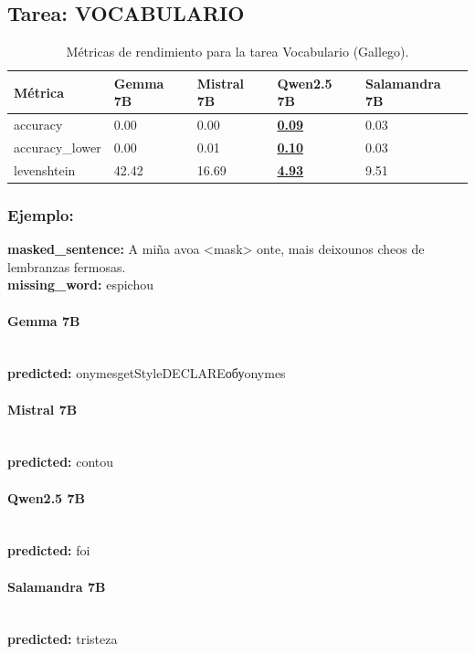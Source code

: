 \subsection{Tarea: VOCABULARIO}\label{tarea-vocabulario}
\begin{longtable}[]{@{}lllll@{}}
\toprule\noalign{}
Métrica & Gemma 7B & Mistral 7B & Qwen2.5 7B & Salamandra 7B \\
\midrule\noalign{}
\endhead
\bottomrule\noalign{}
\caption{Métricas de rendimiento para la tarea Vocabulario (Gallego).}
\label{tab:metricas_vocabulario_Gallego}
\endlastfoot
accuracy & 0.00 & 0.00 & \textbf{\underline{0.09}} & 0.03 \\
accuracy\_lower & 0.00 & 0.01 & \textbf{\underline{0.10}} & 0.03 \\
levenshtein & 42.42 & 16.69 & \textbf{\underline{4.93}} & 9.51 \\
\end{longtable}

\subsubsection{Ejemplo:}
\textbf{masked\_sentence:} A miña avoa {\textless}mask{\textgreater} onte, mais deixounos cheos de lembranzas fermosas.\\
\textbf{missing\_word:} espichou

\paragraph{Gemma 7B}~\\
\textbf{predicted:} onymesgetStyleDECLAREобуonymes

\paragraph{Mistral 7B}~\\
\textbf{predicted:} contou

\paragraph{Qwen2.5 7B}~\\
\textbf{predicted:} foi

\paragraph{Salamandra 7B}~\\
\textbf{predicted:} tristeza

